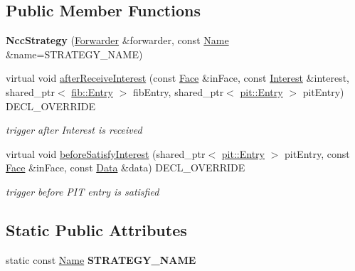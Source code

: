 \subsection*{Public Member Functions}
\begin{DoxyCompactItemize}
\item 
{\bfseries Ncc\+Strategy} (\hyperlink{classnfd_1_1Forwarder}{Forwarder} \&forwarder, const \hyperlink{classndn_1_1Name}{Name} \&name=S\+T\+R\+A\+T\+E\+G\+Y\+\_\+\+N\+A\+ME)\hypertarget{classnfd_1_1fw_1_1NccStrategy_ae6b9f60e4770ed045ec0500e4338f8df}{}\label{classnfd_1_1fw_1_1NccStrategy_ae6b9f60e4770ed045ec0500e4338f8df}

\item 
virtual void \hyperlink{classnfd_1_1fw_1_1NccStrategy_af2615219a128332ad6582293a3614b6e}{after\+Receive\+Interest} (const \hyperlink{classnfd_1_1Face}{Face} \&in\+Face, const \hyperlink{classndn_1_1Interest}{Interest} \&interest, shared\+\_\+ptr$<$ \hyperlink{classnfd_1_1fib_1_1Entry}{fib\+::\+Entry} $>$ fib\+Entry, shared\+\_\+ptr$<$ \hyperlink{classnfd_1_1pit_1_1Entry}{pit\+::\+Entry} $>$ pit\+Entry) D\+E\+C\+L\+\_\+\+O\+V\+E\+R\+R\+I\+DE
\begin{DoxyCompactList}\small\item\em trigger after Interest is received \end{DoxyCompactList}\item 
virtual void \hyperlink{classnfd_1_1fw_1_1NccStrategy_a16bd8028a9b9d29dc4f6dd53e8d0764f}{before\+Satisfy\+Interest} (shared\+\_\+ptr$<$ \hyperlink{classnfd_1_1pit_1_1Entry}{pit\+::\+Entry} $>$ pit\+Entry, const \hyperlink{classnfd_1_1Face}{Face} \&in\+Face, const \hyperlink{classndn_1_1Data}{Data} \&data) D\+E\+C\+L\+\_\+\+O\+V\+E\+R\+R\+I\+DE
\begin{DoxyCompactList}\small\item\em trigger before P\+IT entry is satisfied \end{DoxyCompactList}\end{DoxyCompactItemize}
\subsection*{Static Public Attributes}
\begin{DoxyCompactItemize}
\item 
static const \hyperlink{classndn_1_1Name}{Name} {\bfseries S\+T\+R\+A\+T\+E\+G\+Y\+\_\+\+N\+A\+ME}\hypertarget{classnfd_1_1fw_1_1NccStrategy_aee156d541aec9295b3d470958b83032c}{}\label{classnfd_1_1fw_1_1NccStrategy_aee156d541aec9295b3d470958b83032c}

\end{DoxyCompactItemize}
